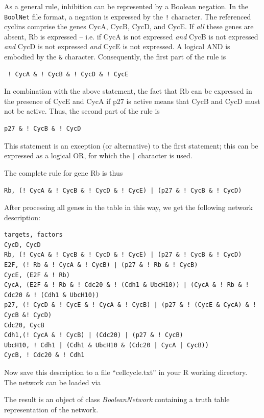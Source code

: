\documentclass[a4paper]{article}
\begin{document}
 As a general rule, inhibition can be represented by a Boolean negation. In the \texttt{BoolNet} file format, a negation is expressed by the \texttt{!} character. The referenced cyclins comprise the genes CycA, CycB, CycD, and CycE. If {\em all} these genes are absent, Rb is expressed -- i.e. if CycA is not expressed {\em and} CycB is not expressed {\em and} CycD is not expressed {\em and} CycE is not expressed. A logical AND is embodied by the \texttt{\&} character. Consequently, the first part of the rule is
 \begin{verbatim}
 ! CycA & ! CycB & ! CycD & ! CycE
 \end{verbatim}
In combination with the above statement, the fact that Rb can be expressed in the presence of CycE and CycA if p27 is active means that CycB and CycD must not be active. Thus, the second part of the rule is
\begin{verbatim}
p27 & ! CycB & ! CycD 
\end{verbatim}
This statement is an exception (or alternative) to the first statement; this can be expressed as a logical OR, for which the \texttt{|} character is used.

The complete rule for gene Rb is thus
\begin{verbatim}
Rb, (! CycA & ! CycB & ! CycD & ! CycE) | (p27 & ! CycB & ! CycD)
\end{verbatim}

After processing all genes in the table in this way, we get the following network description:

\begin{samepage}
\begin{footnotesize}
\begin{verbatim}
targets, factors
CycD, CycD
Rb, (! CycA & ! CycB & ! CycD & ! CycE) | (p27 & ! CycB & ! CycD)
E2F, (! Rb & ! CycA & ! CycB) | (p27 & ! Rb & ! CycB)
CycE, (E2F & ! Rb)
CycA, (E2F & ! Rb & ! Cdc20 & ! (Cdh1 & UbcH10)) | (CycA & ! Rb & ! Cdc20 & ! (Cdh1 & UbcH10))
p27, (! CycD & ! CycE & ! CycA & ! CycB) | (p27 & ! (CycE & CycA) & ! CycB &! CycD)
Cdc20, CycB
Cdh1,(! CycA & ! CycB) | (Cdc20) | (p27 & ! CycB)
UbcH10, ! Cdh1 | (Cdh1 & UbcH10 & (Cdc20 | CycA | CycB))
CycB, ! Cdc20 & ! Cdh1
\end{verbatim} 
\end{footnotesize}
\end{samepage}

Now save this description to a file ``cellcycle.txt'' in your R working directory. The network can be loaded via
\begin{knitrout}
\color{fgcolor}\begin{kframe}
\begin{alltt}
 \hlkwb{<-} \hlstd{(}\hlstd{)}
\end{alltt}
\end{kframe}
\end{knitrout}
The result is an object of class \emph{BooleanNetwork} containing a truth table representation of the network. 
\end{document}
